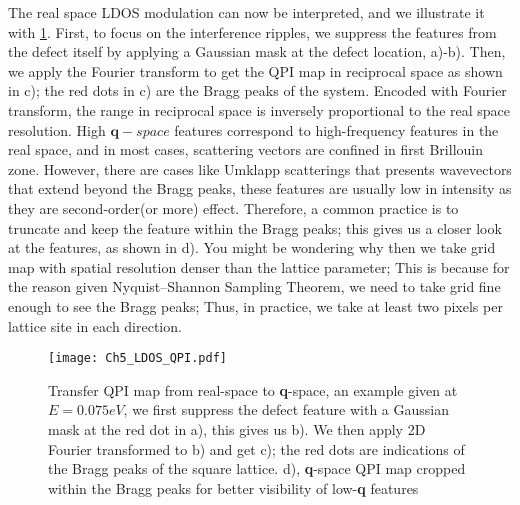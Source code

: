 The real space \ac{LDOS} modulation can now be interpreted, and we illustrate it with \ref{fig:ch5_ldos}. First, to focus on the interference ripples, we suppress the features from the defect itself by applying a Gaussian mask at the defect location, a)-b). Then, we apply the Fourier transform to get the \ac{QPI} map in reciprocal space as shown in c); the red dots in c) are the Bragg peaks of the system. Encoded with Fourier transform, the range in reciprocal space is inversely proportional to the real space resolution. High $\textbf{q}-space$ features correspond to high-frequency features in the real space, and in most cases, scattering vectors are confined in first Brillouin zone. However, there are cases like Umklapp scatterings that presents wavevectors that extend beyond the Bragg peaks, these features are usually low in intensity as they are second-order(or more) effect. Therefore, a common practice is to truncate and keep the feature within the Bragg peaks; this gives us a closer look at the features, as shown in d). You might be wondering why then we take grid map with spatial resolution denser than the lattice parameter; This is because for the reason given Nyquist–Shannon Sampling Theorem, we need to take grid fine enough to see the Bragg peaks; Thus, in practice, we take at least two pixels per lattice site in each direction.  
\begin{figure}
	\centering
	\texttt{[image: Ch5\_LDOS\_QPI.pdf]} 
	\caption{Transfer QPI map from real-space to \textbf{q}-space, an example given at $E=0.075eV$, we first suppress the defect feature with a Gaussian mask at the red dot in a), this gives us b). We then apply 2D Fourier transformed to b) and get c); the red dots are indications of the Bragg peaks of the square lattice. d), \textbf{q}-space QPI map cropped within the Bragg peaks for better visibility of low-\textbf{q} features}
	\label{fig:ch5_ldos}
\end{figure}


